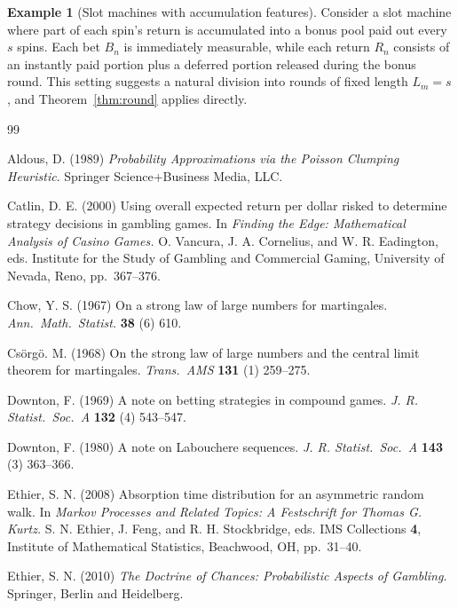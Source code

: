 \documentclass{article}
\theoremstyle{definition}
\newtheorem{example}[theorem]{Example}
\theoremstyle{remark}
\begin{document}
\begin{example}[Slot machines with accumulation features]
Consider a slot machine where part of each spin’s return is accumulated into a bonus pool paid out every $s$ spins.  
Each bet $B_n$ is immediately measurable, while each return $R_n$ consists of an instantly paid portion plus a deferred portion released during the bonus round. This setting suggests a natural division into rounds of fixed length $L_m=s$, and Theorem~\ref{thm:round} applies directly.
\end{example}



\begin{thebibliography}{99}

 Aldous, D. (1989) \textit{Probability Approximations via the Poisson Clumping Heuristic}. Springer Science+Business Media, LLC.

 Catlin, D. E. (2000) Using overall expected return per dollar risked to determine strategy decisions in gambling games.  In \textit{Finding the Edge: Mathematical Analysis of Casino Games.} O. Vancura, J. A. Cornelius, and W. R. Eadington, eds.  Institute for the Study of Gambling and Commercial Gaming, University of Nevada, Reno, pp.\ 367--376.

 Chow, Y. S. (1967) On a strong law of large numbers for martingales. \textit{Ann.\ Math.\ Statist.} \textbf{38} (6) 610. 

 Cs\"org\"o. M. (1968) On the strong law of large numbers and the central limit theorem for martingales. \textit{Trans.\ AMS} 
\textbf{131} (1) 259--275.

 Downton, F. (1969) A note on betting strategies in compound games.  \textit{J. R. Statist.\ Soc.\ A} \textbf{132} (4) 543--547.

 Downton, F. (1980) A note on Labouchere sequences.  \textit{J. R. Statist.\ Soc.\ A} \textbf{143} (3) 363--366.

 Ethier, S. N. (2008) Absorption time distribution for an asymmetric random walk. In \textit{Markov Processes and Related Topics: A Festschrift for Thomas G. Kurtz.}  S. N. Ethier, J. Feng, and R. H. Stockbridge, eds.  IMS Collections \textbf{4},  Institute of Mathematical Statistics, Beachwood, OH, pp.\ 31--40.  

 Ethier, S. N. (2010) \textit{The Doctrine of Chances: Probabilistic Aspects of Gambling}. Springer, Berlin and Heidelberg. 


\end{thebibliography}
\end{document}
